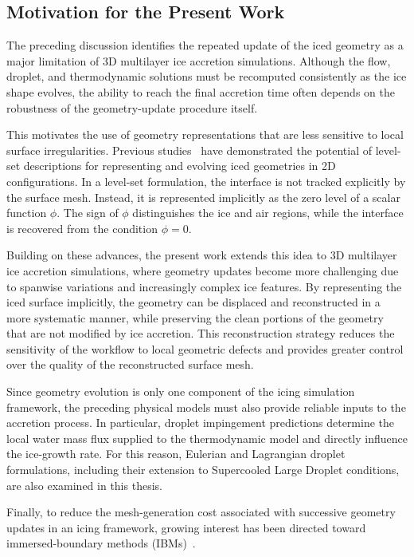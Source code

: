 \subsection{Motivation for the Present Work}

The preceding discussion identifies the repeated update of the iced geometry as a major limitation of 3D multilayer ice accretion simulations. Although the flow, droplet, and thermodynamic solutions must be recomputed consistently as the ice shape evolves, the ability to reach the final accretion time often depends on the robustness of the geometry-update procedure itself.

This motivates the use of geometry representations that are less sensitive to local surface irregularities. Previous studies~\cite{PENA2016278,bourgault-coteMultilayerAirfoilIce2019,lavoieLevelSet} have demonstrated the potential of level-set descriptions for representing and evolving iced geometries in 2D configurations. In a level-set formulation, the interface is not tracked explicitly by the surface mesh. Instead, it is represented implicitly as the zero level of a scalar function $\phi$. The sign of $\phi$ distinguishes the ice and air regions, while the interface is recovered from the condition $\phi=0$.

Building on these  advances, the present work extends this idea to 3D multilayer ice accretion simulations, where geometry updates become more challenging due to spanwise variations and increasingly complex ice features. By representing the iced surface implicitly, the geometry can be displaced and reconstructed in a more systematic manner, while preserving the clean portions of the geometry that are not modified by ice accretion. This reconstruction strategy reduces the sensitivity of the workflow to local geometric defects and provides greater control over the quality of the reconstructed surface mesh.

Since geometry evolution is only one component of the icing simulation framework, the preceding physical models must also provide reliable inputs to the accretion process. In particular, droplet impingement predictions determine the local water mass flux supplied to the thermodynamic model and directly influence the ice-growth rate. For this reason, Eulerian and Lagrangian droplet formulations, including their extension to Supercooled Large Droplet conditions, are also examined in this thesis.


Finally, to reduce the mesh-generation cost associated with successive geometry updates in an icing framework, growing interest has been directed toward immersed-boundary methods (IBMs)~\cite{capizzanoIcing,lavoieLevelSet,pabloIcing}.

